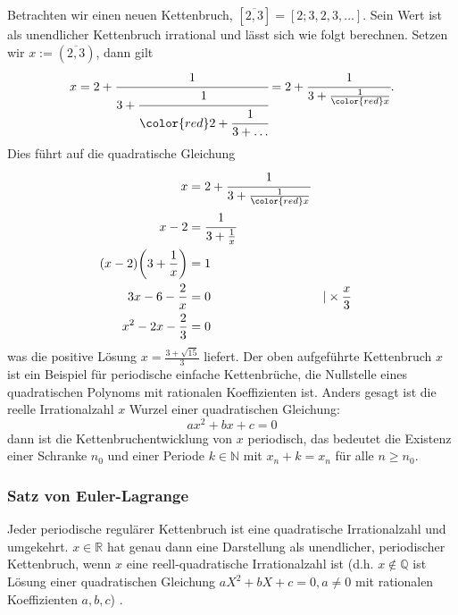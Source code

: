 \begin{beispiel}
Betrachten wir einen neuen Kettenbruch, $[\overline{2,3}] =  [2;3,2,3,\dots]$.
Sein Wert ist als unendlicher Kettenbruch irrational und lässt sich
wie folgt berechnen. Setzen wir $x:=(\overline{2,3})$, dann gilt
\begin{equation}
x
=
2 + \cfrac{1}{3+\cfrac{1}{\color{red}2+\cfrac{1}{3+\dots}}}
=
2 + \cfrac{1}{3+\frac{1}{\color{red}x}}.
\end{equation}
Dies führt auf die quadratische Gleichung 
\begin{align*}
x &= 2 + \cfrac{1}{3+\frac{1}{{\color{red}x}}}
\\
x - 2 &= \cfrac{1}{3+\frac{1}{x}}
\\
(x - 2)\biggl(3 + \frac{1}{x}\biggr) &= 1
\\
3x - 6 - \frac{2}{x} &= 0 &&\vert \times\frac{x}{3}
\\
x^2 - 2x - \frac{2}{3} &= 0
\end{align*}
was die positive Lösung $x = \frac{3+\sqrt{15}}{3}$ liefert.
Der oben aufgeführte Kettenbruch $x$ ist ein Beispiel für periodische
einfache Kettenbrüche, die Nullstelle eines quadratischen Polynoms
mit rationalen Koeffizienten ist. Anders gesagt ist die reelle
Irrationalzahl $x$ Wurzel einer quadratischen Gleichung:
\begin{equation}
ax^2 + bx + c = 0
\end{equation}
dann ist die Kettenbruchentwicklung von $x$ periodisch, das bedeutet
die Existenz einer Schranke $n_0$ und einer Periode $k \in \mathbb{N}$
mit $x_n+k = x_n$ für alle $n\ge n_0$.
\end{beispiel}



\subsubsection{Satz von Euler-Lagrange}
Jeder periodische regulärer Kettenbruch ist eine quadratische
Irrationalzahl und umgekehrt. $x \in \mathbb{R}$ hat genau dann eine 
Darstellung als unendlicher, periodischer Kettenbruch, wenn $x$ eine
reell-quadratische Irrationalzahl ist (d.h. $x \notin \mathbb{Q}$ ist Lösung
einer quadratischen Gleichung $aX^2 + bX + c = 0, a \neq 0$ mit rationalen 
Koeffizienten $a,b,c$) \cite{kettenbruch:perron}.

